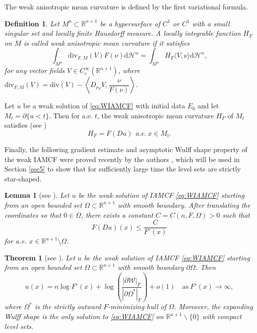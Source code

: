\documentclass[10pt,a4paper]{amsart}
\newtheorem{theorem}[proposition]{Theorem}
\newtheorem{lemma}[proposition]{Lemma}
\newtheorem{definition}[proposition]{Definition}
\numberwithin{equation}{section}
\begin{document}
	The weak anisotropic mean curvature is defined by the first variational formula.
	\begin{definition}
		\label{def-wamc}
		Let $M^n\subset\mathbb{R}^{n+1}$ be a hypersurface of $C^1$ or $C^1$ with a small singular set and locally finite Hausdorff measure. A locally integrable function $H_F$ on $M$ is called weak anisotropic mean curvature if it satisfies
		\begin{equation}
			\int_{M^n} \mathrm{div}_{F,M}(V) F(\nu)\mathrm{d}\mathcal{H}^{n} = \int_{M^n} H_F \langle V,\nu \rangle \mathrm{d}\mathcal{H}^{n},
			\label{equ-wamc}
		\end{equation}
		for any vector fields $V\in C_c^{\infty}(\mathbb{R}^{n+1})$, where $\mathrm{div}_{F,M}(V)=\mathrm{div}(V)-\left\langle D_{\nu_F} V, \dfrac{\nu}{F(\nu)} \right\rangle$.
	\end{definition}
	
Let $u$ be a weak solution of \eqref{eq:WIAMCF} with initial data $E_0$ and let $M_t=\partial\{u<t\}$. Then for a.e. $t$, the weak anisotropic mean curvature $H_F$ of $M_t$ satisfies (see {\cite[Proposition 3.5]{DGX23}})
\begin{equation} \label{lem-level}
H_F = F(Du)\ \ a.e.\ x\in M_t.
\end{equation}

Finally, the following gradient estimate and asymptotic Wulff shape property of the weak IAMCF were proved recently by the authors \cite{GWZ26}, which will be used in Section \ref{sec5} to show that for sufficiently large time the level sets are strictly star-shaped. 

\begin{lemma}[see {\cite[Corollary 1.5]{GWZ26}}]
	\label{lem:weak-gradient}
	Let $u$ be the weak solution of IAMCF \eqref{eq:WIAMCF} starting from an open bounded set $\Omega\subset\mathbb{R}^{n+1}$ with smooth boundary. After translating the coordinates so that $0\in\Omega$, there exists a constant $C=C(n,F,\Omega)>0$ such that
	\begin{equation}
		\label{eq:weak-gradient}
		F(Du)(x)\leq \frac{C}{F^\circ(x)}
	\end{equation}
	for a.e. $x\in\mathbb{R}^{n+1}\setminus\Omega$.
\end{lemma}

    \begin{theorem}[{see \cite[Theorem 1.6]{GWZ26}}]
    \label{thm:anisotropic-asymptotic}
        Let $u$ be the weak solution of IAMCF \eqref{eq:WIAMCF} starting from an open bounded set $\Omega\subset\mathbb{R}^{n+1}$ with smooth boundary $\partial\Omega$. Then
	   \begin{equation*}
		  u(x) = n\log F^{\circ}(x)+\log\left( \dfrac{|\partial\mathcal{W}|_F}{|\partial\Omega^*|_F} \right) + o(1) \quad \text{as} \ F^\circ(x) \to \infty,
	   \end{equation*}
        where $\Omega^*$ is the strictly outward $F$-minimizing hull of $\Omega$. Moreover, the expanding Wulff shape is the only solution to \eqref{eq:WIAMCF} on $\mathbb{R}^{n+1}\backslash\{0\}$ with compact level sets.
    \end{theorem}
	
\end{document}
